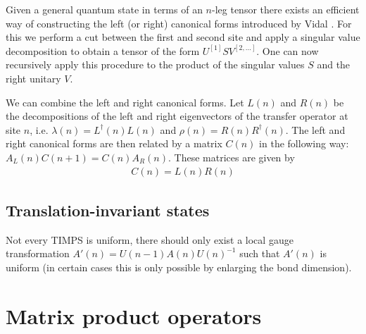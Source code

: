 	\begin{method}[Vidal]
		Given a general quantum state in terms of an $n$-leg tensor there exists an efficient way of constructing the left (or right) canonical forms introduced by Vidal \cite{VidalCanForm}. For this we perform a cut between the first and second site and apply a singular value decomposition to obtain a tensor of the form $U^{[1]}SV^{[2, ...]}$. One can now recursively apply this procedure to the product of the singular values $S$ and the right unitary $V$.
	\end{method}
	
	\begin{construct}
		We can combine the left and right canonical forms. Let $L(n)$ and $R(n)$ be the decompositions of the left and right eigenvectors of the transfer operator at site $n$, i.e. $\lambda(n)=L^\dag(n)L(n)$ and $\rho(n)=R(n)R^\dag(n)$. The left and right canonical forms are then related by a matrix $C(n)$ in the following way: $A_L(n)C(n+1)=C(n)A_R(n)$. These matrices are given by
		\begin{gather}
			C(n)=L(n)R(n)
		\end{gather}
	\end{construct}
	
\subsection{Translation-invariant states}

	\begin{remark}[TIMPS]
		Not every TIMPS is uniform, there should only exist a local gauge transformation $A'(n) = U(n-1)A(n)U(n)^{-1}$ such that $A'(n)$ is uniform (in certain cases this is only possible by enlarging the bond dimension).
	\end{remark}


\section{Matrix product operators}

